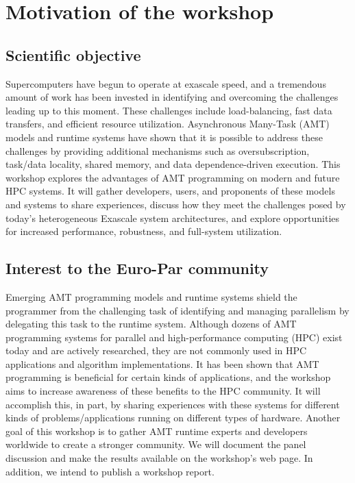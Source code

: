 \documentclass{article}
\begin{document}
\section*{Motivation of the workshop}

\subsection*{Scientific objective}

Supercomputers have begun to operate at exascale speed, and a tremendous amount of work has been invested in identifying and overcoming the challenges leading up to this moment. These challenges include load-balancing, fast data transfers, and efficient resource utilization.  Asynchronous Many-Task (AMT) models and runtime systems have shown that it is possible to address these challenges by providing additional mechanisms such as oversubscription, task/data locality, shared memory, and data dependence-driven execution. 
This workshop explores the advantages of AMT programming on modern and future  HPC systems. It will gather developers, users, and proponents of these models and systems to share experiences, discuss how they meet the challenges posed by today's heterogeneous Exascale system architectures, and explore opportunities for increased performance, robustness, and full-system utilization.

\subsection*{Interest to the Euro-Par community}

Emerging AMT programming models and runtime systems shield the programmer from the challenging task of identifying and managing parallelism by delegating this task to the runtime system. Although dozens of AMT programming systems for parallel and high-performance computing (HPC) exist today and are actively researched, they are not commonly used in HPC applications and algorithm implementations. It has been shown that AMT programming is beneficial for certain kinds of applications, and the workshop aims to increase awareness of these benefits to the HPC community. 
It will accomplish this, in part, by sharing experiences with these systems for different kinds of problems/applications running on different types of hardware. Another goal of this workshop is to gather AMT runtime experts and developers worldwide to create a stronger community. 
We will document the panel discussion and make the results available on the workshop’s web page. In addition, we intend to publish a workshop report.
\end{document}
